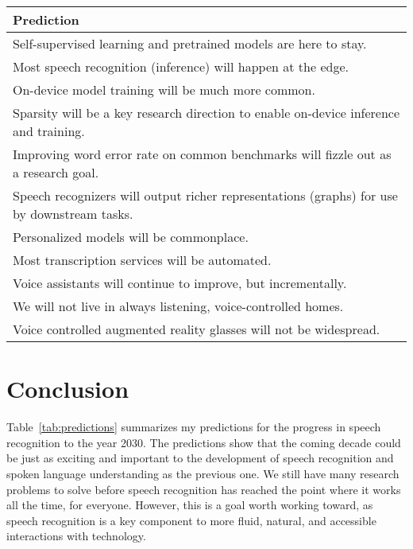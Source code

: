 \begin{table*}[ht!]
    \caption{Predictions for the progress in speech recognition research and applications
    by the year 2030.}
    \centering
    \begin{tabular}{l}
    \toprule
    Prediction \\
    \midrule
    Self-supervised learning and pretrained models are here to stay. \\
    \rowcolor{Gray} Most speech recognition (inference) will happen at the edge. \\
    On-device model training will be much more common. \\
    \rowcolor{Gray} Sparsity will be a key research direction to enable on-device inference and training. \\
    Improving word error rate on common benchmarks will fizzle out as a research goal. \\
    \rowcolor{Gray} Speech recognizers will output richer representations (graphs) for use by downstream tasks. \\
    Personalized models will be commonplace. \\
    \rowcolor{Gray} Most transcription services will be automated. \\
    Voice assistants will continue to improve, but incrementally. \\
    \rowcolor{Gray} We will not live in always listening, voice-controlled homes. \\
    Voice controlled augmented reality glasses will not be widespread. \\
    \bottomrule
    \end{tabular}
    \label{tab:predictions}
\end{table*}

\section{Conclusion}
\label{sec:conclusion}

Table~\ref{tab:predictions} summarizes my predictions for the progress in
speech recognition to the year 2030. The predictions show that the coming
decade could be just as exciting and important to the development of speech
recognition and spoken language understanding as the previous one. We still
have many research problems to solve before speech recognition has reached the
point where it works all the time, for everyone. However, this is a goal worth
working toward, as speech recognition is a key component to more fluid,
natural, and accessible interactions with technology.
